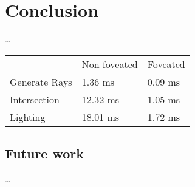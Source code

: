 
\section{Conclusion}
\ldots




\begin{table}[h]
\begin{tabular}{lll}
  & Non-foveated & Foveated \\
  Generate Rays & 1.36\phantom{0} ms        & 0.09 ms \\
  Intersection  & 12.32 ms       & 1.05 ms \\
  Lighting      & 18.01 ms       & 1.72 ms
\end{tabular}
\end{table}

\subsection{Future work}
\ldots



